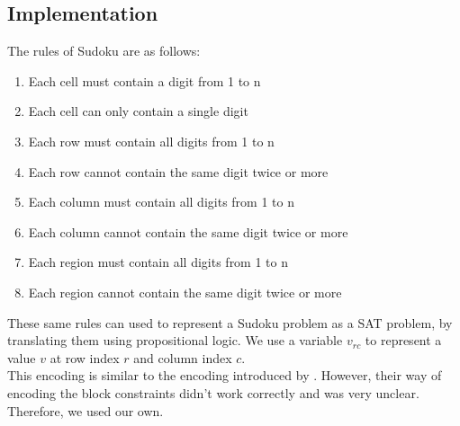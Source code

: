 \documentclass[letterpaper]{article}
\begin{document}
\subsection{Implementation}
The rules of Sudoku are as follows:
\begin{enumerate}
    \item Each cell must contain a digit from 1 to n
    \item Each cell can only contain a single digit
    \item Each row must contain all digits from 1 to n
    \item Each row cannot contain the same digit twice or more
    \item Each column must contain all digits from 1 to n
    \item Each column cannot contain the same digit twice or more
    \item Each region must contain all digits from 1 to n
    \item Each region cannot contain the same digit twice or more
\end{enumerate}
These same rules can used to represent a Sudoku problem as a SAT problem, by translating them using propositional logic. We use a variable $v_{rc}$ to represent a value $v$ at row index $r$ and column index $c$. \\
This encoding is similar to the encoding introduced by \cite{kwon2006optimized}. However, their way of encoding the block constraints didn't work correctly and was very unclear. Therefore, we used our own.\\
\end{document}
